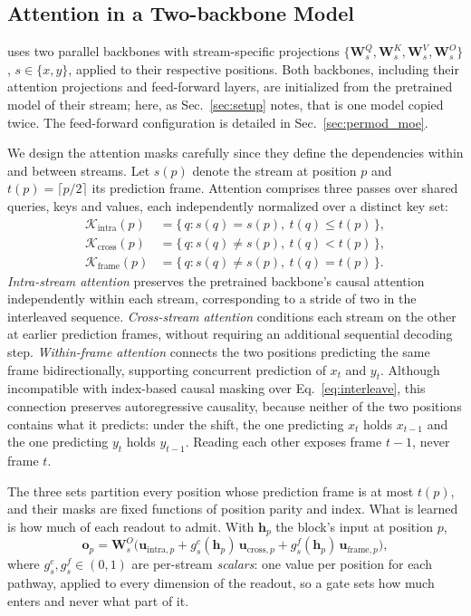 \subsection{Attention in a Two-backbone Model}
\label{sec:attention}

\sys uses two parallel backbones with stream-specific projections
$\{\mathbf{W}^{Q}_{s}, \mathbf{W}^{K}_{s}, \mathbf{W}^{V}_{s},
\mathbf{W}^{O}_{s}\}$, $s \in \{x, y\}$, applied to their respective
positions. Both backbones, including their attention projections and
feed-forward layers, are initialized from the pretrained model of their
stream; here, as Sec.~\ref{sec:setup} notes, that is one model copied
twice.
The feed-forward configuration is detailed in
Sec.~\ref{sec:permod_moe}.

We design the attention masks carefully since they define the
dependencies within and between streams. Let $s(p)$ denote the stream
at position $p$ and $t(p) = \lceil p/2 \rceil$ its prediction frame.
Attention comprises three passes over shared queries, keys and values,
each independently normalized over a distinct key set:
\begin{align}
  \mathcal{K}_{\text{intra}}(p)
    &= \{\, q : s(q) = s(p),\ t(q) \le t(p) \,\},
    \label{eq:kintra}\\
  \mathcal{K}_{\text{cross}}(p)
    &= \{\, q : s(q) \neq s(p),\ t(q) < t(p) \,\},
    \label{eq:kcross}\\
  \mathcal{K}_{\text{frame}}(p)
    &= \{\, q : s(q) \neq s(p),\ t(q) = t(p) \,\}.
    \label{eq:kframe}
\end{align}
\emph{Intra-stream attention} preserves the pretrained backbone's
causal attention independently within each stream, corresponding to a
stride of two in the interleaved sequence. \emph{Cross-stream
attention} conditions each stream on the other at earlier prediction
frames, without requiring an additional sequential decoding step.
\emph{Within-frame attention} connects the two positions predicting the
same frame bidirectionally, supporting concurrent prediction of $x_t$
and $y_t$. Although incompatible with index-based causal masking over
Eq.~\eqref{eq:interleave}, this connection preserves autoregressive
causality, because neither of the two positions contains what it
predicts: under the shift, the one predicting $x_t$ holds $x_{t-1}$ and
the one predicting $y_t$ holds $y_{t-1}$. Reading each other exposes
frame $t{-}1$, never frame $t$.

The three sets partition every position whose prediction frame is at
most $t(p)$, and their masks are fixed functions of position parity and
index. What is learned is how much of each readout to admit. With
$\mathbf{h}_p$ the block's input at position $p$,
\begin{equation}
  \mathbf{o}_p = \mathbf{W}^{O}_{s}\bigl(
    \mathbf{u}_{\text{intra},p}
    + g^{c}_{s}(\mathbf{h}_p)\,\mathbf{u}_{\text{cross},p}
    + g^{f}_{s}(\mathbf{h}_p)\,\mathbf{u}_{\text{frame},p}\bigr),
  \label{eq:gates}
\end{equation}
where $g^{c}_{s}, g^{f}_{s} \in (0,1)$ are per-stream \emph{scalars}:
one value per position for each pathway, applied to every dimension of
the readout, so a gate sets how much enters and never what part of it.

